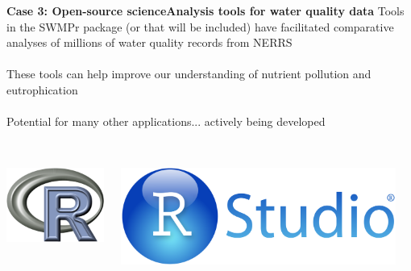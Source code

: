 \documentclass[serif]{beamer}\usepackage[]{graphicx}\usepackage[]{color}
\begin{document}
\begin{frame}{\textbf{Case 3: Open-source science}}{\textbf{Analysis tools for water quality data}}
\onslide<+->
Tools in the SWMPr package (or that will be included) have facilitated comparative analyses of millions of water quality records from NERRS \\~\\
These tools can help improve our understanding of nutrient pollution and eutrophication \\~\\
\onslide<+->
Potential for many other applications... actively being developed \\~\\
\begin{columns}
\begin{column}{0.25\textwidth}
\centerline{\includegraphics[width = \textwidth]{fig/Rlogo.png}}
\end{column}
\begin{column}{0.25\textwidth}
\centerline{\includegraphics[width = \textwidth]{fig/RStudio.png}}
\end{column}
\begin{column}{0.25\textwidth}

\end{column}
\end{columns}
\end{frame}
\end{document}
